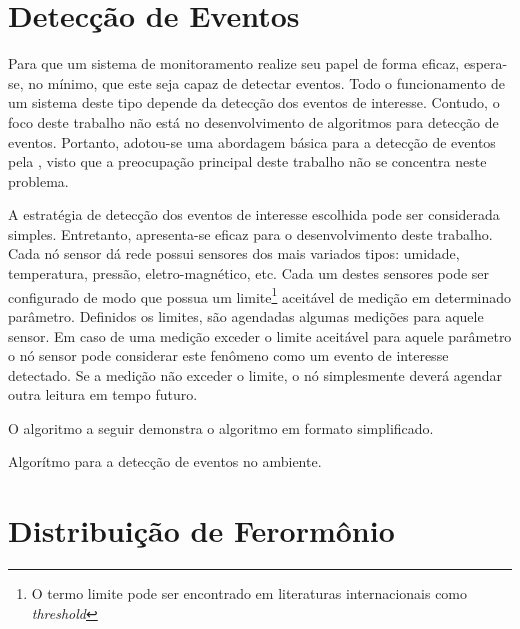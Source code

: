 \section{Detecção de Eventos}
Para que um sistema de monitoramento realize seu papel de forma eficaz, espera-se, no mínimo, que este seja capaz de detectar eventos. Todo o funcionamento
de um sistema deste tipo depende da detecção dos eventos de interesse. Contudo, o foco deste trabalho não está no desenvolvimento de algoritmos para 
detecção de eventos. Portanto, adotou-se uma abordagem básica para a detecção de eventos pela \rssf, visto que a preocupação principal deste trabalho não se concentra neste problema.

A estratégia de detecção dos eventos de interesse escolhida pode ser considerada simples. Entretanto, apresenta-se eficaz para o desenvolvimento deste trabalho.
Cada nó sensor dá rede possui sensores dos mais variados tipos: umidade, temperatura, pressão, eletro-magnético, etc. Cada um destes sensores pode ser
configurado de modo que possua um limite\footnote{O termo limite pode ser encontrado em literaturas internacionais como \emph{threshold}} aceitável de medição em determinado parâmetro. Definidos os limites, são agendadas algumas medições para aquele sensor. Em caso de uma medição exceder o limite aceitável
para aquele parâmetro o nó sensor pode considerar este fenômeno como um evento de interesse detectado. Se a medição não exceder o limite, o nó simplesmente
deverá agendar outra leitura em tempo futuro.

O algoritmo a seguir demonstra o algoritmo em formato simplificado. \\

\begin{algorithm}[H]
	\SetAlgoLined
	

	
\caption{Algorítmo para a detecção de eventos no ambiente.}
\end{algorithm}


\section{Distribuição de Ferormônio}

